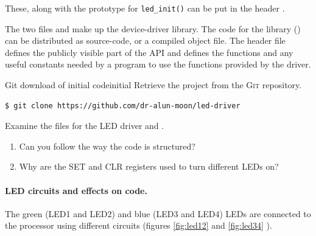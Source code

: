 \documentclass[a4paper]{tufte-handout}
\begin{document}
These, along with the prototype for \verb'led_init()' can be put in the
header .

\begin{tcolorbox}[colframe=red!75!black,title=API and Driver Library]
The two files  and  make up the device-driver
library.  The code for the library () can be distributed
as source-code, or a compiled object file.  The header file
 defines the publicly visible part of the API and defines
the functions and any useful constants needed by a program to use the
functions provided by the driver.
\end{tcolorbox}

\begin{exercise}{Git download of initial code}{initial}
    Retrieve the project from the \textsc{Git} repository.
\begin{verbatim}
$ git clone https://github.com/dr-alun-moon/led-driver
\end{verbatim}
    Examine the files for the LED driver  and
    .
    \begin{enumerate}
    \item Can you follow the way the code is structured?
    \item Why are the SET and CLR registers used to turn different
      LEDs on?
    \end{enumerate}
  \end{exercise}

\paragraph{LED circuits and effects on code.}
The green (LED1 and LED2) and blue (LED3 and LED4) LEDs are connected
to the processor using different circuits (figures \ref{fig:led12} and
\ref{fig:led34} \citep{quickstart}).
\end{document}
